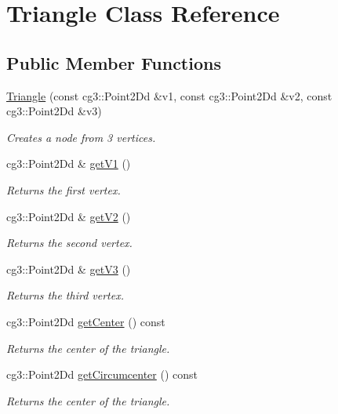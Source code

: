\hypertarget{classTriangle}{}\section{Triangle Class Reference}
\label{classTriangle}
\subsection*{Public Member Functions}
\begin{DoxyCompactItemize}
\item 
\hyperlink{classTriangle_a3bb081f3c4d90284e27e1005a2b33599}{Triangle} (const cg3\+::\+Point2\+Dd \&v1, const cg3\+::\+Point2\+Dd \&v2, const cg3\+::\+Point2\+Dd \&v3)
\begin{DoxyCompactList}\small\item\em Creates a node from 3 vertices. \end{DoxyCompactList}\item 
cg3\+::\+Point2\+Dd \& \hyperlink{classTriangle_a67057550ec55c6fbd3e1cf512fb88c4a}{get\+V1} ()
\begin{DoxyCompactList}\small\item\em Returns the first vertex. \end{DoxyCompactList}\item 
cg3\+::\+Point2\+Dd \& \hyperlink{classTriangle_ae1d2450565f168c8c18d17a6c726f8e8}{get\+V2} ()
\begin{DoxyCompactList}\small\item\em Returns the second vertex. \end{DoxyCompactList}\item 
cg3\+::\+Point2\+Dd \& \hyperlink{classTriangle_aa5b85443932443cf6b035c56af82aad8}{get\+V3} ()
\begin{DoxyCompactList}\small\item\em Returns the third vertex. \end{DoxyCompactList}\item 
cg3\+::\+Point2\+Dd \hyperlink{classTriangle_a4d120f7288b7051a1cf442268edd328d}{get\+Center} () const
\begin{DoxyCompactList}\small\item\em Returns the center of the triangle. \end{DoxyCompactList}\item 
cg3\+::\+Point2\+Dd \hyperlink{classTriangle_a0ac42109ff92fc5b907283e10d7946b2}{get\+Circumcenter} () const
\begin{DoxyCompactList}\small\item\em Returns the center of the triangle. \end{DoxyCompactList}\end{DoxyCompactItemize}
